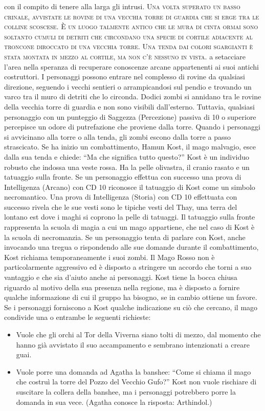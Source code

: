 \documentclass{article}
\begin{document}
con il compito di tenere alla larga gli intrusi.
\textsc{Una volta superato un basso crinale, avvistate le rovine di
una vecchia torre di guardia che si erge tra le colline scoscese.
È un luogo talmente antico che le mura di cinta ormai sono
soltanto cumuli di detriti che circondano una specie di cortile
adiacente al troncone diroccato di una vecchia torre. Una
tenda dai colori sgargianti è stata montata in mezzo al cortile,
ma non c'è nessuno in vista.}
a setacciare l’area nella speranza di recuperare conoscenze
arcane appartenenti ai suoi antichi costruttori. I personaggi
possono entrare nel complesso di rovine da qualsiasi
direzione, seguendo i vecchi sentieri o arrampicandosi
sul pendio e trovando un varco tra il muro di detriti
che lo circonda.
Dodici zombi si annidano tra le rovine della vecchia torre
di guardia e non sono visibili dall'esterno. Tuttavia, qualsiasi
personaggio con un punteggio di Saggezza (Percezione)
passiva di 10 o superiore percepisce un odore di putrefazione
che proviene dalla torre. Quando i personaggi si avvicinano
alla torre o alla tenda, gli zombi escono dalla torre a
passo strascicato.
Se ha inizio un combattimento, Hamun Kost, il mago
malvagio, esce dalla sua tenda e chiede: “Ma che significa
tutto questo?”
Kost è un individuo robusto che indossa una veste rossa.
Ha la pelle olivastra, il cranio rasato e un tatuaggio sulla
fronte. Se un personaggio effettua con successo una prova di
Intelligenza (Arcano) con CD 10 riconosce il tatuaggio di Kost
come un simbolo necromantico. Una prova di Intelligenza
(Storia) con CD 10 effettuata con successo rivela che le sue
vesti sono le tipiche vesti del Thay, una terra del lontano
est dove i maghi si coprono la pelle di tatuaggi. Il tatuaggio
sulla fronte rappresenta la scuola di magia a cui un mago
appartiene, che nel caso di Kost è la scuola di necromanzia.
Se un personaggio tenta di parlare con Kost, anche
invocando una tregua o rispondendo alle sue domande
durante il combattimento, Kost richiama temporaneamente i
suoi zombi. Il Mago Rosso non è particolarmente aggressivo
ed è disposto a stringere un accordo che torni a suo vantaggio
e che sia d'aiuto anche ai personaggi.
Kost tiene la bocca chiusa riguardo al motivo della sua
presenza nella regione, ma è disposto a fornire qualche
informazione di cui il gruppo ha bisogno, se in cambio
ottiene un favore. Se i personaggi forniscono a Kost qualche
indicazione su ciò che cercano, il mago condivide una o
entrambe le seguenti richieste:
\begin{itemize}
    \item Vuole che gli orchi al Tor della Viverna siano tolti di mezzo,
dal momento che hanno già avvistato il suo accampamento
e sembrano intenzionati a creare guai.
    \item Vuole porre una domanda ad Agatha la banshee: “Come si
chiama il mago che costruì la torre del Pozzo del Vecchio
Gufo?” Kost non vuole rischiare di suscitare la collera della
banshee, ma i personaggi potrebbero porre la domanda in
sua vece. (Agatha conosce la risposta: Arthindol.)
\end{itemize}
\end{document}
